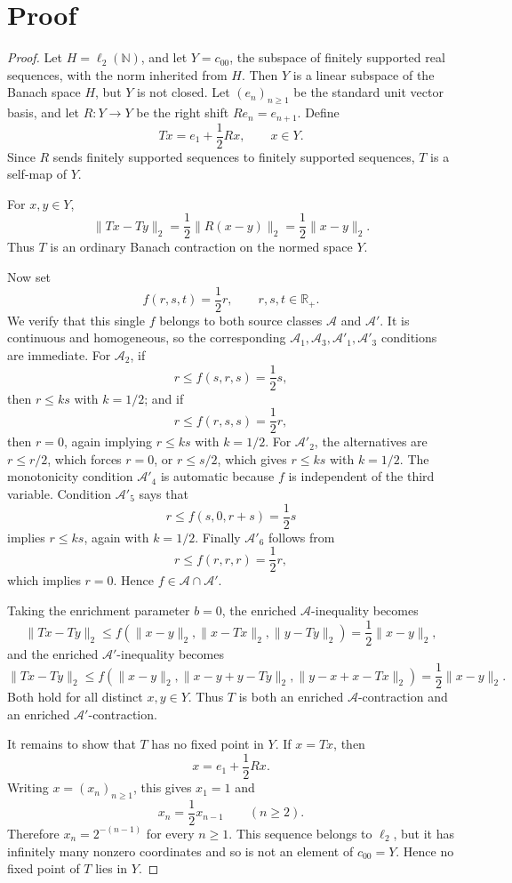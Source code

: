 \documentclass[11pt]{article}
\newcommand{\N}{\mathbb N}
\newcommand{\R}{\mathbb R}
\newcommand{\A}{\mathcal A}
\newcommand{\Aprime}{\mathcal A'}
\newcommand{\ellTwo}{\ell_2}
\begin{document}
\section*{Proof}

\begin{proof}
Let \(H=\ellTwo(\N)\), and let \(Y=c_{00}\), the subspace of finitely supported
real sequences, with the norm inherited from \(H\).  Then \(Y\) is a linear
subspace of the Banach space \(H\), but \(Y\) is not closed.  Let
\((e_n)_{n\ge 1}\) be the standard unit vector basis, and let \(R:Y\to Y\) be
the right shift \(R e_n=e_{n+1}\).  Define
\[
  T x=e_1+\frac12 R x,\qquad x\in Y.
\]
Since \(R\) sends finitely supported sequences to finitely supported sequences,
\(T\) is a self-map of \(Y\).

For \(x,y\in Y\),
\[
  \|T x-T y\|_2
  =\frac12\|R(x-y)\|_2
  =\frac12\|x-y\|_2.
\]
Thus \(T\) is an ordinary Banach contraction on the normed space \(Y\).

Now set
\[
  f(r,s,t)=\frac12 r,\qquad r,s,t\in\R_+.
\]
We verify that this single \(f\) belongs to both source classes \(\A\) and
\(\Aprime\).  It is continuous and homogeneous, so the corresponding
\(\A_1,\A_3,\Aprime_1,\Aprime_3\) conditions are immediate.  For \(\A_2\), if
\[
  r\le f(s,r,s)=\frac12 s,
\]
then \(r\le ks\) with \(k=1/2\); and if
\[
  r\le f(r,s,s)=\frac12 r,
\]
then \(r=0\), again implying \(r\le ks\) with \(k=1/2\).  For \(\Aprime_2\),
the alternatives are \(r\le r/2\), which forces \(r=0\), or
\(r\le s/2\), which gives \(r\le ks\) with \(k=1/2\).  The monotonicity
condition \(\Aprime_4\) is automatic because \(f\) is independent of the third
variable.  Condition \(\Aprime_5\) says that
\[
  r\le f(s,0,r+s)=\frac12 s
\]
implies \(r\le ks\), again with \(k=1/2\).  Finally \(\Aprime_6\) follows from
\[
  r\le f(r,r,r)=\frac12 r,
\]
which implies \(r=0\).  Hence \(f\in \A\cap\Aprime\).

Taking the enrichment parameter \(b=0\), the enriched \(\A\)-inequality becomes
\[
  \|T x-T y\|_2
  \le f(\|x-y\|_2,\|x-Tx\|_2,\|y-Ty\|_2)
  =\frac12\|x-y\|_2,
\]
and the enriched \(\Aprime\)-inequality becomes
\[
  \|T x-T y\|_2
  \le
  f(\|x-y\|_2,\|x-y+y-Ty\|_2,\|y-x+x-Tx\|_2)
  =\frac12\|x-y\|_2.
\]
Both hold for all distinct \(x,y\in Y\).  Thus \(T\) is both an enriched
\(\A\)-contraction and an enriched \(\Aprime\)-contraction.

It remains to show that \(T\) has no fixed point in \(Y\).  If \(x=Tx\), then
\[
  x=e_1+\frac12 R x.
\]
Writing \(x=(x_n)_{n\ge 1}\), this gives \(x_1=1\) and
\[
  x_n=\frac12 x_{n-1}\qquad(n\ge 2).
\]
Therefore \(x_n=2^{-(n-1)}\) for every \(n\ge 1\).  This sequence belongs to
\(\ellTwo\), but it has infinitely many nonzero coordinates and so is not an
element of \(c_{00}=Y\).  Hence no fixed point of \(T\) lies in \(Y\).
\end{proof}
\end{document}
